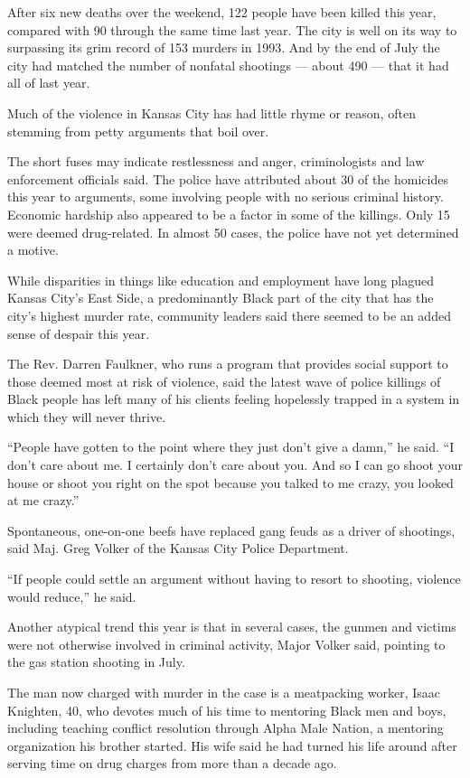 After six new deaths over the weekend, 122 people have been killed this
year, compared with 90 through the same time last year. The city is well
on its way to surpassing its grim record of 153 murders in 1993. And by
the end of July the city had matched the number of nonfatal shootings
--- about 490 --- that it had all of last year.

Much of the violence in Kansas City has had little rhyme or reason,
often stemming from petty arguments that boil over.

The short fuses may indicate restlessness and anger, criminologists and
law enforcement officials said. The police have attributed about 30 of
the homicides this year to arguments, some involving people with no
serious criminal history. Economic hardship also appeared to be a factor
in some of the killings. Only 15 were deemed drug-related. In almost 50
cases, the police have not yet determined a motive.

While disparities in things like education and employment have long
plagued Kansas City's East Side, a predominantly Black part of the city
that has the city's highest murder rate, community leaders said there
seemed to be an added sense of despair this year.

The Rev. Darren Faulkner, who runs a program that provides social
support to those deemed most at risk of violence, said the latest wave
of police killings of Black people has left many of his clients feeling
hopelessly trapped in a system in which they will never thrive.

``People have gotten to the point where they just don't give a damn,''
he said. ``I don't care about me. I certainly don't care about you. And
so I can go shoot your house or shoot you right on the spot because you
talked to me crazy, you looked at me crazy.''

Spontaneous, one-on-one beefs have replaced gang feuds as a driver of
shootings, said Maj. Greg Volker of the Kansas City Police Department.

``If people could settle an argument without having to resort to
shooting, violence would reduce,'' he said.

Another atypical trend this year is that in several cases, the gunmen
and victims were not otherwise involved in criminal activity, Major
Volker said, pointing to the gas station shooting in July.

The man now charged with murder in the case is a meatpacking worker,
Isaac Knighten, 40, who devotes much of his time to mentoring Black men
and boys, including teaching conflict resolution through Alpha Male
Nation, a mentoring organization his brother started. His wife said he
had turned his life around after serving time on drug charges from more
than a decade ago.

